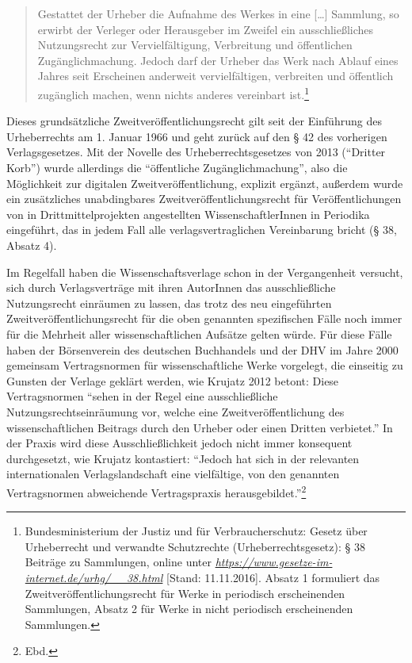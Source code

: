 \documentclass[a4paper,
fontsize=11pt,
oneside,
numbers=noperiodatend,
parskip=half-,
bibliography=totoc,
final
]{scrartcl}
\begin{document}
\begin{quote}
Gestattet der Urheber die Aufnahme des Werkes in eine {[}\ldots{}{]}
Sammlung, so erwirbt der Verleger oder Herausgeber im Zweifel ein
ausschließliches Nutzungsrecht zur Vervielfältigung, Verbreitung und
öffentlichen Zugänglichmachung. Jedoch darf der Urheber das Werk nach
Ablauf eines Jahres seit Erscheinen anderweit vervielfältigen,
verbreiten und öffentlich zugänglich machen, wenn nichts anderes
vereinbart ist.\footnote{Bundesministerium der Justiz und für
  Verbraucherschutz: Gesetz über Urheberrecht und verwandte Schutzrechte
  (Urheberrechtsgesetz): § 38 Beiträge zu Sammlungen, online unter
  \href{https://www.gesetze-im-internet.de/urhg/__38.html}{\emph{https://www.gesetze-im-internet.de/urhg/\_\_38.html}}
  {[}Stand: 11.11.2016{]}. Absatz 1 formuliert das
  Zweitveröffentlichungsrecht für Werke in periodisch erscheinenden
  Sammlungen, Absatz 2 für Werke in nicht periodisch erscheinenden
  Sammlungen.}
\end{quote}

Dieses grundsätzliche Zweitveröffentlichungsrecht gilt seit der
Einführung des Urheberrechts am 1. Januar 1966 und geht zurück auf den §
42 des vorherigen Verlagsgesetzes. Mit der Novelle des
Urheberrechtsgesetzes von 2013 (\enquote{Dritter Korb}) wurde allerdings
die \enquote{öffentliche Zugänglichmachung}, also die Möglichkeit zur
digitalen Zweitveröffentlichung, explizit ergänzt, außerdem wurde ein
zusätzliches unabdingbares Zweitveröffentlichungsrecht für
Veröffentlichungen von in Drittmittelprojekten angestellten
WissenschaftlerInnen in Periodika eingeführt, das in jedem Fall alle
verlagsvertraglichen Vereinbarung bricht (§ 38, Absatz 4).

Im Regelfall haben die Wissenschaftsverlage schon in der Vergangenheit
versucht, sich durch Verlagsverträge mit ihren AutorInnen das
ausschließliche Nutzungsrecht einräumen zu lassen, das trotz des neu
eingeführten Zweitveröffentlichungsrecht für die oben genannten
spezifischen Fälle noch immer für die Mehrheit aller wissenschaftlichen
Aufsätze gelten würde. Für diese Fälle haben der Börsenverein des
deutschen Buchhandels und der DHV im Jahre 2000 gemeinsam Vertragsnormen
für wissenschaftliche Werke vorgelegt, die einseitig zu Gunsten der
Verlage geklärt werden, wie Krujatz 2012 betont: Diese Vertragsnormen
\enquote{sehen in der Regel eine ausschließliche
Nutzungsrechtseinräumung vor, welche eine Zweitveröffentlichung des
wissenschaftlichen Beitrags durch den Urheber oder einen Dritten
verbietet.} In der Praxis wird diese Ausschließlichkeit jedoch nicht
immer konsequent durchgesetzt, wie Krujatz kontastiert: \enquote{Jedoch
hat sich in der relevanten internationalen Verlagslandschaft eine
vielfältige, von den genannten Vertragsnormen abweichende Vertragspraxis
herausgebildet.}\footnote{Ebd.}
\end{document}
